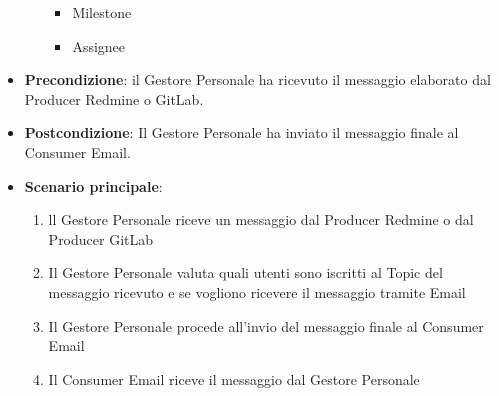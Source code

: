 \begin{itemize}
\begin{itemize}
\begin{itemize}
				\item Milestone
				\item Assignee
			\end{itemize}
		\end{itemize}
		\item \textbf{Precondizione}: il Gestore Personale ha ricevuto il messaggio elaborato dal Producer Redmine o GitLab.
		\item \textbf{Postcondizione}: Il Gestore Personale ha inviato il messaggio finale al Consumer Email.
		\item \textbf{Scenario principale}: 
		\begin{enumerate}
			\item ll Gestore Personale riceve un messaggio dal Producer Redmine o dal Producer GitLab
			\item Il Gestore Personale valuta quali utenti sono iscritti al Topic del messaggio ricevuto e se vogliono ricevere il messaggio tramite Email
			\item Il Gestore Personale procede all'invio del messaggio finale al Consumer Email
            \item Il Consumer Email riceve il messaggio dal Gestore Personale
		\end{enumerate}
	\end{itemize}